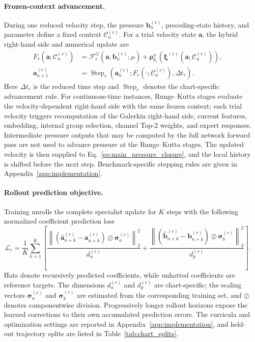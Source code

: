 \paragraph{Frozen-context advancement.}
During one reduced velocity step, the pressure $\bm b_n^{(r)}$,
preceding-state history, and parameter define a fixed context
$\mathcal C_n^{(r)}$. For a trial velocity state $\bm a$, the hybrid
right-hand side and numerical update are
\begin{align}
  F_r(\bm a;\mathcal C_n^{(r)})
  &=\mathcal F_r^G(\bm a,\bm b_n^{(r)};\mu)
    +\bm\rho^u_{\theta_r}\!\left(
      \bm\xi^{(r)}(\bm a;\mathcal C_n^{(r)})\right),
    \label{eq:main_frozen_context_rhs}
    \\
  \bm a_{n+1}^{(r)}
  &=\operatorname{Step}_r\!\left(
     \bm a_n^{(r)};
     F_r(\cdot;\mathcal C_n^{(r)}),\Delta t_r\right).
    \label{eq:main_specialist_step}
\end{align}
Here $\Delta t_r$ is the reduced time step and
$\operatorname{Step}_r$ denotes the chart-specific advancement rule. For continuous-time instances, Runge--Kutta stages evaluate the velocity-dependent right-hand side with the same frozen context; each trial velocity triggers recomputation of the Galerkin right-hand side, current features, embedding, internal group selection, channel
Top-2 weights, and expert responses. Intermediate pressure outputs that may be computed by the full network forward pass are not used to advance pressure at the Runge--Kutta stages. The updated velocity is then supplied to Eq.~\eqref{eq:main_pressure_closure}, and the local history is shifted before the next step.  Benchmark-specific stepping rules are given in Appendix~\ref{app:implementation}.

\paragraph{Rollout prediction objective.}
Training unrolls the complete specialist update for $K$ steps with the following normalized coefficient prediction loss
\begin{equation}
  \mathcal L_r=\frac{1}{K}\sum_{k=1}^{K}\left[
  \frac{\left\|(\widehat{\bm a}_{n+k}^{(r)}-\bm a_{n+k}^{(r)})
  \oslash\bm\sigma_a^{(r)}\right\|_2^2}{d_u^{(r)}}
  +\frac{\left\|(\widehat{\bm b}_{n+k}^{(r)}-\bm b_{n+k}^{(r)})
  \oslash\bm\sigma_b^{(r)}\right\|_2^2}{d_p^{(r)}}\right].
  \label{eq:main_rollout_loss}
\end{equation}
Hats denote recursively predicted coefficients, while unhatted coefficients are reference targets. The dimensions $d_u^{(r)}$ and $d_p^{(r)}$ are chart-specific; the scaling vectors $\bm\sigma_a^{(r)}$ and $\bm\sigma_b^{(r)}$ are estimated from the corresponding training set, and $\oslash$ denotes componentwise division.  Progressively longer
rollout horizons expose the learned corrections to their own
accumulated prediction errors. The curricula and optimization
settings are reported in Appendix~\ref{app:implementation}, and held-out trajectory splits are listed in Table~\ref{tab:chart_splits}.

